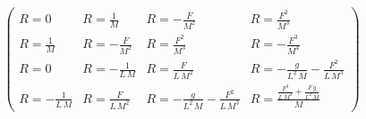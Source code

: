 \begin{equation}
\left(\begin{array}{cccc} R=0 & R=\frac{1}{M} & R=-\frac{F}{M^2} & R=\frac{F^2}{M^3}\\ R=\frac{1}{M} & R=-\frac{F}{M^2} & R=\frac{F^2}{M^3} & R=-\frac{F^3}{M^4}\\ R=0 & R=-\frac{1}{L\,M} & R=\frac{F}{L\,M^2} & R=-\frac{g}{L^2\,M}-\frac{F^2}{L\,M^3}\\ R=-\frac{1}{L\,M} & R=\frac{F}{L\,M^2} & R=-\frac{g}{L^2\,M}-\frac{F^2}{L\,M^3} & R=\frac{\frac{F^3}{L\,M^3}+\frac{F\,g}{L^2\,M}}{M} \end{array}\right)
\end{equation}
